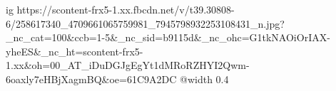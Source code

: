  
 
 
 
 

\ifcmt
  ig https://scontent-frx5-1.xx.fbcdn.net/v/t39.30808-6/258617340_4709661065759981_7945798932253108431_n.jpg?_nc_cat=100&ccb=1-5&_nc_sid=b9115d&_nc_ohc=G1tkNAOiOrIAX-yheES&_nc_ht=scontent-frx5-1.xx&oh=00_AT_iDuDGJgEgYt1dMRoRZHYI2Qwm-6oaxly7eHBjXagmBQ&oe=61C9A2DC
  @width 0.4
\fi

